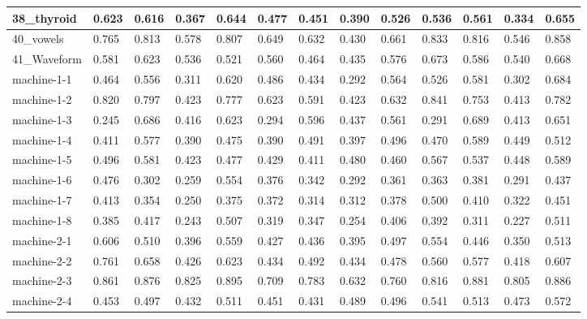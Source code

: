 \begin{table}[]
{\begin{tabular}{|l||l|l|l|l||l|l|l|l||l|l|l|l|}
		\hline
		38\_thyroid     & 0.623 & 0.616 & 0.367  & 0.644 & 0.477 & 0.451 & 0.390  & 0.526 & 0.536 & 0.561        & 0.334 & 0.655 \\ 
		\hline
		40\_vowels      & 0.765 & 0.813 & 0.578  & 0.807 & 0.649 & 0.632 & 0.430  & 0.661 & 0.833 & 0.816        & 0.546 & 0.858 \\ 
		\hline
		41\_Waveform    & 0.581 & 0.623 & 0.536  & 0.521 & 0.560 & 0.464 & 0.435  & 0.576 & 0.673 & 0.586        & 0.540 & 0.668 \\ 
		\hline
		machine-1-1     & 0.464 & 0.556 & 0.311  & 0.620 & 0.486 & 0.434 & 0.292  & 0.564 & 0.526 & 0.581        & 0.302 & 0.684 \\ 
		\hline
		machine-1-2     & 0.820 & 0.797 & 0.423  & 0.777 & 0.623 & 0.591 & 0.423  & 0.632 & 0.841 & 0.753        & 0.413 & 0.782 \\ 
		\hline
		machine-1-3     & 0.245 & 0.686 & 0.416  & 0.623 & 0.294 & 0.596 & 0.437  & 0.561 & 0.291 & 0.689        & 0.413 & 0.651 \\ 
		\hline
		machine-1-4     & 0.411 & 0.577 & 0.390  & 0.475 & 0.390 & 0.491 & 0.397  & 0.496 & 0.470 & 0.589        & 0.449 & 0.512 \\ 
		\hline
		machine-1-5     & 0.496 & 0.581 & 0.423  & 0.477 & 0.429 & 0.411 & 0.480  & 0.460 & 0.567 & 0.537        & 0.448 & 0.589 \\ 
		\hline
		machine-1-6     & 0.476 & 0.302 & 0.259  & 0.554 & 0.376 & 0.342 & 0.292  & 0.361 & 0.363 & 0.381        & 0.291 & 0.437 \\ 
		\hline
		machine-1-7     & 0.413 & 0.354 & 0.250  & 0.375 & 0.372 & 0.314 & 0.312  & 0.378 & 0.500 & 0.410        & 0.322 & 0.451 \\ 
		\hline
		machine-1-8     & 0.385 & 0.417 & 0.243  & 0.507 & 0.319 & 0.347 & 0.254  & 0.406 & 0.392 & 0.311        & 0.227 & 0.511 \\ 
		\hline
		machine-2-1     & 0.606 & 0.510 & 0.396  & 0.559 & 0.427 & 0.436 & 0.395  & 0.497 & 0.554 & 0.446        & 0.350 & 0.513 \\ 
		\hline
		machine-2-2     & 0.761 & 0.658 & 0.426  & 0.623 & 0.434 & 0.492 & 0.434  & 0.478 & 0.560 & 0.577        & 0.418 & 0.607 \\ 
		\hline
		machine-2-3     & 0.861 & 0.876 & 0.825  & 0.895 & 0.709 & 0.783 & 0.632  & 0.760 & 0.816 & 0.881        & 0.805 & 0.886 \\ 
		\hline
		machine-2-4     & 0.453 & 0.497 & 0.432  & 0.511 & 0.451 & 0.431 & 0.489  & 0.496 & 0.541 & 0.513        & 0.473 & 0.572 \\ 

\end{tabular}}
\end{table}

